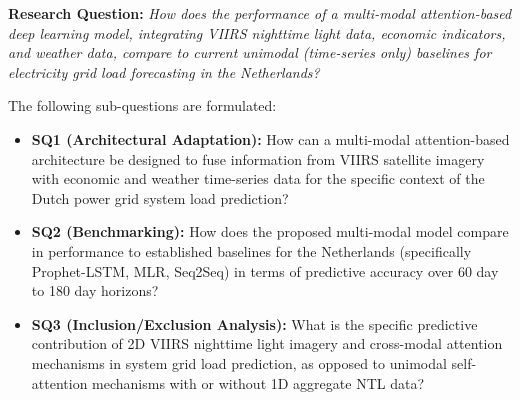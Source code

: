 \bigskip

\noindent\textbf{Research Question:} \textit{How does the performance of a multi-modal attention-based deep learning model, integrating VIIRS nighttime light data, economic indicators, and weather data, compare to current unimodal (time-series only) baselines for electricity grid load forecasting in the Netherlands?}

The following sub-questions are formulated:
\begin{itemize}
    \item \textbf{SQ1 (Architectural Adaptation):} How can a multi-modal attention-based architecture be designed to fuse information from VIIRS satellite imagery with economic and weather time-series data for the specific context of the Dutch power grid system load prediction?
    \item \textbf{SQ2 (Benchmarking):} How does the proposed multi-modal model compare in performance to established baselines for the Netherlands (specifically Prophet-LSTM, MLR, Seq2Seq) in terms of predictive accuracy over 60 day to 180 day horizons?
    \item \textbf{SQ3 (Inclusion/Exclusion Analysis):} What is the specific predictive contribution of 2D VIIRS nighttime light imagery and cross-modal attention mechanisms in system grid load prediction, as opposed to unimodal self-attention mechanisms with or without 1D aggregate NTL data?
\end{itemize}
